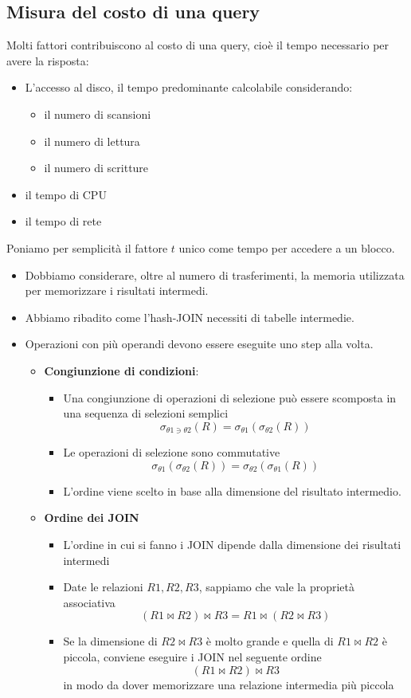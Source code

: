 \subsection{Misura del costo di una query}
Molti fattori contribuiscono al costo di una query, cioè il tempo necessario per avere la risposta:
\begin{itemize}
	\item L'accesso al disco, il tempo predominante calcolabile considerando:
	\begin{itemize}
		\item il numero di scansioni
		\item il numero di lettura
		\item il numero di scritture
	\end{itemize}
	\item il tempo di CPU
	\item il tempo di rete
\end{itemize}
Poniamo per semplicità il fattore $t$ unico come tempo per accedere a un blocco. 
\begin{itemize}
	\item Dobbiamo considerare, oltre al numero di trasferimenti, la memoria utilizzata per memorizzare i risultati intermedi. 
	\item Abbiamo ribadito come l'hash-JOIN necessiti di tabelle intermedie.
	\item Operazioni con più operandi devono essere eseguite uno step alla volta.
	\begin{itemize}
		\item \textbf{Congiunzione di condizioni}:
		\begin{itemize}
			\item Una congiunzione di operazioni di selezione può essere scomposta in una sequenza di selezioni semplici
			\[\sigma_{\theta1 \ni \theta2}(R)=\sigma_{\theta1}(\sigma_{\theta2}(R))\]
			\item Le operazioni di selezione sono commutative
			\[\sigma_{\theta1}(\sigma_{\theta2}(R))=\sigma_{\theta2}(\sigma_{\theta1}(R))\]
			\item L'ordine viene scelto in base alla dimensione del risultato intermedio.
		\end{itemize}
		\item \textbf{Ordine dei JOIN}
		\begin{itemize}
			\item L'ordine in cui si fanno i JOIN dipende dalla dimensione dei risultati intermedi
			\item Date le relazioni $R1, R2, R3$, sappiamo che vale la proprietà associativa
			\[(R1 \Join R2) \Join R3 = R1 \Join (R2 \Join R3)\]
			\item Se la dimensione di $R2 \Join R3$ è molto grande e quella di $R1 \Join R2$ è piccola, conviene eseguire i JOIN nel seguente ordine
			\[(R1 \Join R2) \Join R3\]
			in modo da dover memorizzare una relazione intermedia più piccola
		\end{itemize}
	\end{itemize}
\end{itemize}
\pagebreak
